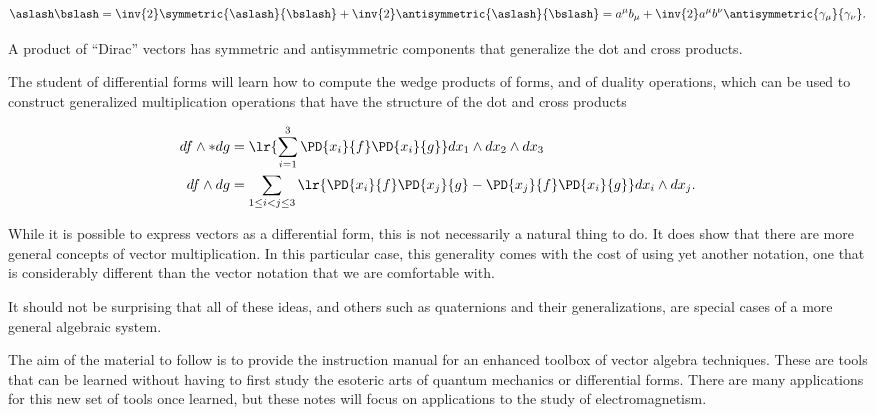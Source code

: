 \begin{dmath}\label{eqn:GAIntroduction:140}
\aslash \bslash
=
\inv{2} \symmetric{ \aslash}{ \bslash }
+
\inv{2} \antisymmetric{ \aslash}{ \bslash }
=
a^\mu b_\mu + \inv{2} a^\mu b^\nu \antisymmetric{\gamma_\mu}{\gamma_\nu}.
\end{dmath}

A product of ``Dirac'' vectors has symmetric and antisymmetric components that generalize the dot and cross products.

The student of differential forms will learn how to compute the wedge products of forms, and of duality operations, which can be used to construct generalized multiplication operations that have the structure of the dot and cross products

\begin{equation}\label{eqn:GAIntroduction:160}
\begin{aligned}
df \wedge * dg &= \lr{ \sum_{i=1}^3 \PD{x_i}{f} \PD{x_i}{g} } dx_1 \wedge dx_2 \wedge dx_3 \\
df \wedge dg &= \sum_{1 \le i < j \le 3} \lr{
\PD{x_i}{f} \PD{x_j}{g} 
-\PD{x_j}{f} \PD{x_i}{g} 
}
dx_i \wedge dx_j.
\end{aligned}
\end{equation}

While it is possible to express vectors as a differential form, this is not necessarily a natural thing to do.  It does show that there are more general concepts of vector multiplication.  In this particular case, this generality comes with the cost of using yet another notation, one that is considerably different than the vector notation that we are comfortable with.  

It should not be surprising that all of these ideas, and others such as quaternions and their generalizations, are special cases of a more general algebraic system.

The aim of the material to follow is to provide the instruction manual for an enhanced toolbox of vector algebra techniques.  These are tools that can be learned without having to first study the esoteric arts of quantum mechanics or differential forms.
There are many applications for this new set of tools once learned, but these notes will focus on applications to the study of electromagnetism.

